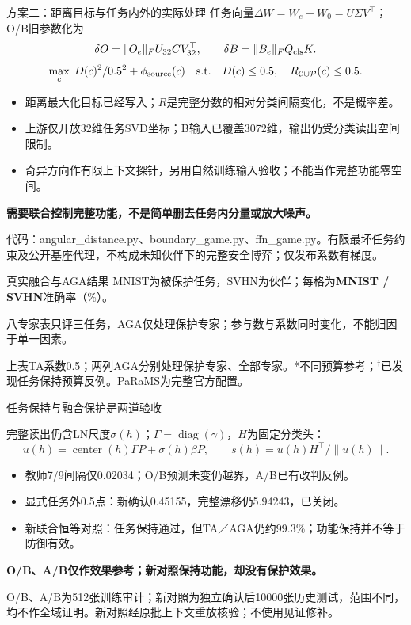 \documentclass[aspectratio=169,11pt]{beamer}
\newcommand{\source}[1]{{\vfill\scriptsize\color{muted}#1\par}}
\newcommand{\key}[1]{{\color{accent}\bfseries#1}}
\begin{document}
\begin{frame}{方案二：距离目标与任务内外的实际处理}
\small
任务向量$\Delta W=W_e-W_0=U\Sigma V^\top$；O/B旧参数化为
\[
\delta O=\|O_e\|_F U_{32}CV_{32}^\top,\qquad
\delta B=\|B_e\|_F Q_{\rm cls}K.
\]
\[
\max_c\;D(c)^2/0.5^2+\phi_{\rm source}(c)
\quad\mathrm{s.t.}\quad D(c)\le0.5,\quad R_{\mathcal C\cup\mathcal P}(c)\le0.5.
\]
\begin{itemize}\setlength{\itemsep}{5pt}
\item 距离最大化目标已经写入；$R$是完整分数的相对分类间隔变化，不是概率差。
\item 上游仅开放32维任务SVD坐标；B输入已覆盖3072维，输出仍受分类读出空间限制。
\item 奇异方向作有限上下文探针，另用自然训练输入验收；不能当作完整功能零空间。
\end{itemize}
\key{需要联合控制完整功能，不是简单删去任务内分量或放大噪声。}
\source{代码：angular\_distance.py、boundary\_game.py、ffn\_game.py。有限最坏任务约束及公开基座代理，不构成未知伙伴下的完整安全博弈；仅发布系数有梯度。}
\end{frame}

\begin{frame}{真实融合与AGA结果}
\setlength{\parskip}{2pt}
\small MNIST为被保护任务，SVHN为伙伴；每格为\textbf{MNIST / SVHN}准确率（\%）。
\vspace{1mm}
{\centering\footnotesize\MainTable\par}
\vspace{1mm}
{\centering\footnotesize\EightTable\par}
\scriptsize 八专家表只评三任务，AGA仅处理保护专家；参与数与系数同时变化，不能归因于单一因素。
\source{上表TA系数0.5；两列AGA分别处理保护专家、全部专家。*不同预算参考；$^\dagger$已发现任务保持预算反例。PaRaMS为完整官方配置。}
\end{frame}

\begin{frame}[t]{任务保持与融合保护是两道验收}
\setlength{\parskip}{2pt}
\vspace{1mm}
{\centering\footnotesize\UtilityTable\par}
\small
完整读出仍含LN尺度$\sigma(h)$；$\Gamma=\operatorname{diag}(\gamma)$，$H$为固定分类头：
\[
u(h)=\operatorname{center}(h)\Gamma P+\sigma(h)\beta P,
\qquad s(h)=u(h)H^\top/\|u(h)\|.
\]
\begin{itemize}\setlength{\itemsep}{3pt}
\item 教师7/9间隔仅0.02034；O/B预测未变仍越界，A/B已有改判反例。
\item 显式任务外0.5点：新确认0.45155，完整漂移仍5.94243，已关闭。
\item 新联合恒等对照：任务保持通过，但TA／AGA仍约99.3\%；功能保持并不等于防御有效。
\end{itemize}
\key{O/B、A/B仅作效果参考；新对照保持功能，却没有保护效果。}
\source{O/B、A/B为512张训练审计；新对照为独立确认后10000张历史测试，范围不同，均不作全域证明。新对照经原批上下文重放核验；不使用见证修补。}
\end{frame}
\end{document}

